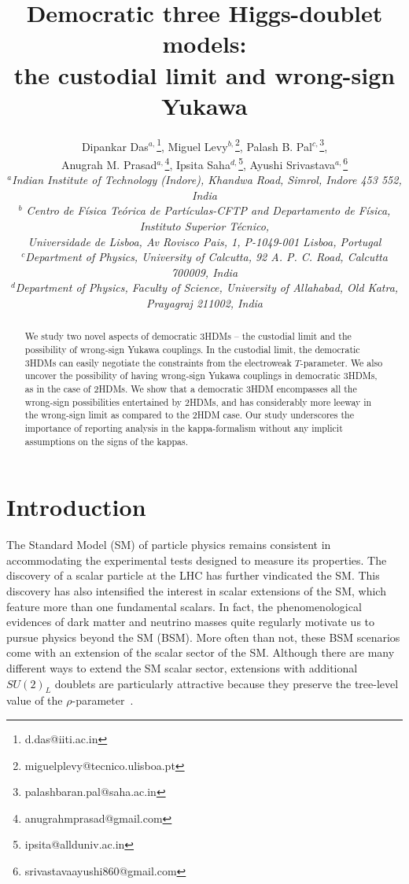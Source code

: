 \documentclass[11pt]{article}
\title{\Large\bf 
Democratic three Higgs-doublet models: \\the custodial limit and wrong-sign Yukawa
}
\author{
  \sf 
  Dipankar Das$^{a,}$\footnote{d.das@iiti.ac.in},
  Miguel Levy$^{b,}$\footnote{miguelplevy@tecnico.ulisboa.pt},
  Palash B. Pal$^{c,}$\footnote{palashbaran.pal@saha.ac.in},\\
  \sf
  Anugrah M. Prasad$^{a,}$\footnote{anugrahmprasad@gmail.com},
  Ipsita  Saha$^{d,}$\footnote{ipsita@allduniv.ac.in},
  Ayushi Srivastava$^{a,}$\footnote{srivastavaayushi860@gmail.com}
\\[3mm]
    \small\em
    $^a$Indian Institute of Technology (Indore), Khandwa Road, Simrol,
  Indore 453 552, India \\
  \small\em
  $^b$ Centro de F\'isica Te\'orica de Part\'iculas-CFTP and Departamento de
  F\'isica,  Instituto Superior T\'ecnico,\\  \small\em
  Universidade de Lisboa, Av
  Rovisco Pais, 1, P-1049-001 Lisboa, Portugal \\ 
 \small\em
  $^c$Department of Physics, University of Calcutta, 92 A. P. C. Road,
  Calcutta 700009, India\\
 \small\em
  $^d$Department of Physics, Faculty of Science, University of Allahabad, Old Katra,
  Prayagraj 211002, India
  }
\date{}
\begin{document}

\maketitle



\renewcommand*{\thefootnote}{\arabic{footnote}}
\setcounter{footnote}{0} 
\begin{abstract}
We study two novel aspects of democratic 3HDMs -- the custodial limit and the possibility of wrong-sign Yukawa couplings.  
In the custodial limit, the democratic 3HDMs can easily negotiate the constraints from the electroweak $T$-parameter.  
We also uncover the possibility of having wrong-sign Yukawa couplings in democratic 3HDMs, as in the case of 2HDMs.  
We show that a democratic 3HDM encompasses all the wrong-sign possibilities entertained by 2HDMs, and has considerably more leeway in the wrong-sign limit as compared to the 2HDM case.  
Our study underscores the importance of reporting analysis in the kappa-formalism without any implicit assumptions on the signs of the kappas.
%
\end{abstract}



\bigskip



\section{Introduction} \label{s:intro}

The Standard Model (SM) of particle physics remains consistent in 
accommodating the experimental tests designed to measure its 
properties.  
The discovery of a scalar particle at the LHC has further vindicated the SM.  
This discovery has also intensified the interest in scalar extensions 
of the SM, which feature more than one fundamental scalars.  
%
In fact, the phenomenological evidences of dark matter 
and neutrino masses quite regularly motivate us to pursue physics beyond the 
SM (BSM). More often than not, these BSM scenarios come with an extension 
of the scalar sector of the SM.  
%
Although 
there are many different ways to extend the SM scalar sector,
extensions with additional $SU(2)_L$ doublets are particularly attractive because 
they preserve the tree-level value of the $\rho$-parameter~\cite{Workman:2022ynf}.
\iffalse,
%
\begin{equation}
\label{e:rho}
\rho = \frac{M_W^2}{M_Z^2 \cos^2\theta_W} = 1, 
\end{equation}
where $\theta_W$ is the weak mixing angle, and $M_{W}$ ($M_Z$) is the $W$ ($Z$) 
boson mass.  
\fi
\end{document}
